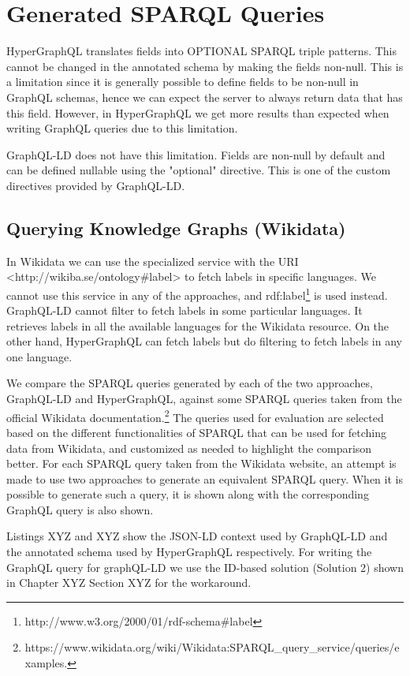 \section{Generated SPARQL Queries}
HyperGraphQL translates fields into OPTIONAL SPARQL triple patterns. This cannot be changed in the annotated schema by making the fields non-null. This is a limitation since it is generally possible to define fields to be non-null in GraphQL schemas, hence we can expect the server to always return data that has this field. However, in HyperGraphQL we get more results than expected when writing GraphQL queries due to this limitation. 

GraphQL-LD does not have this limitation. Fields are non-null by default and can be defined nullable using the "optional" directive. This is one of the custom directives provided by GraphQL-LD.


\subsection{Querying Knowledge Graphs (Wikidata)}
In Wikidata we can use the specialized service with the URI <http://wikiba.se/ontology\#label> to fetch labels in specific languages. We cannot use this service in any of the approaches, and rdf:label\footnote{http://www.w3.org/2000/01/rdf-schema\#label} is used instead. GraphQL-LD cannot filter to fetch labels in some particular languages. It retrieves labels in all the available languages for the Wikidata resource. On the other hand, HyperGraphQL can fetch labels but do filtering to fetch labels in any one language. 

We compare the SPARQL queries generated by each of the two approaches, GraphQL-LD and HyperGraphQL, against some SPARQL queries taken from the official Wikidata documentation.\footnote{https://www.wikidata.org/wiki/Wikidata:SPARQL\_query\_service/queries/examples.} The queries used for evaluation are selected based on the different functionalities of SPARQL that can be used for fetching data from Wikidata, and customized as needed to highlight the comparison better. For each SPARQL query taken from the Wikidata website, an attempt is made to use two approaches to generate an equivalent SPARQL query. When it is possible to generate such a query, it is shown along with the corresponding GraphQL query is also shown.

Listings XYZ and XYZ show the JSON-LD context used by GraphQL-LD and the annotated schema used by HyperGraphQL respectively. For writing the GraphQL query for graphQL-LD we use the ID-based solution (Solution 2) shown in Chapter XYZ Section XYZ for the workaround.


